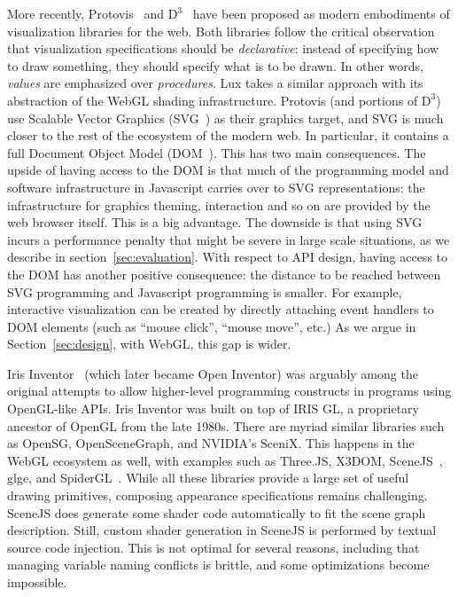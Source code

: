 More recently, Protovis~\cite{Bostock:2009:PAG} and
$\textrm{D}^3$~\cite{Bostock:2011:DDD} have been proposed as modern
embodiments of visualization libraries for the web.  Both libraries
follow the critical observation that visualization specifications
should be \emph{declarative}: instead of specifying how to draw
something, they should specify what is to be drawn. In other words,
\emph{values} are emphasized over \emph{procedures}.
%
Lux takes a similar
approach with its abstraction of the WebGL shading infrastructure.
% 
Protovis (and portions of $\textrm{D}^3$) use Scalable Vector Graphics
(SVG~\cite{svg-spec}) as their graphics target, and SVG is much closer
to the rest of the ecosystem of the modern web. In particular, it
contains a full Document Object Model (DOM~\cite{dom-spec}). This has
two main consequences.
%
The upside of having access to the DOM is that much of the programming
model and software infrastructure in Javascript carries over to SVG
representations: the infrastructure for graphics theming, interaction
and so on are provided by the web browser itself. This is a big
advantage.
%
The downside is that using SVG incurs a performance penalty that might
be severe in large scale situations, as we describe in
section~\ref{sec:evaluation}.
%
With respect to API design, having access to the DOM has another
positive consequence: the distance to be reached between SVG
programming and Javascript programming is smaller. For example,
interactive visualization can be created by directly attaching
event handlers to DOM elements (such as ``mouse click'',
``mouse move'', etc.)
%
As we argue in Section~\ref{sec:design}, with WebGL, this gap is 
wider.

Iris Inventor~\cite{Strauss:1993:IIA} (which later became Open
Inventor) was arguably among the original attempts to allow
higher-level programming constructs in programs using OpenGL-like
APIs.
%
Iris Inventor was built on top of IRIS GL, a proprietary ancestor of
OpenGL from the late 1980s.
%
There are myriad similar libraries such as OpenSG, OpenSceneGraph, and
NVIDIA's SceniX.
%
This happens in the WebGL ecosystem as well, with examples such as
Three.JS, X3DOM, SceneJS~\cite{SceneJS}, glge, and
SpiderGL~\cite{DiBenedetto:2010:SAJ}.
%
While all these libraries provide a large set of useful drawing
primitives, composing appearance specifications remains challenging.
%
SceneJS does generate some shader code automatically to fit the scene
graph description. Still, custom shader generation in SceneJS is
performed by textual source code injection. This is not optimal for
several reasons, including that managing variable naming conflicts is
brittle, and some optimizations become impossible.

